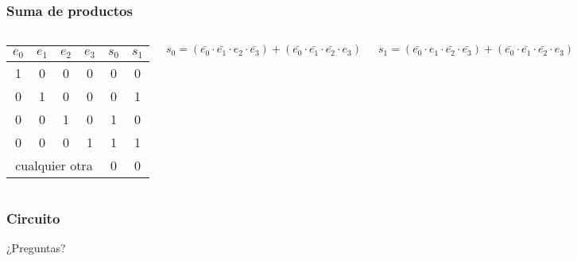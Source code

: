\documentclass[spanish]{beamer}
\begin{document}
\begin{frame}
  \frametitle{Suma de productos}

  \begin{columns}

    \begin{center}
      \begin{tabular}{c|c|c|c||c|c}
        $e_0$ & $e_1$ & $e_2$ & $e_3$ & $s_0$ & $s_1$ \\
        \hline
        1 & 0 & 0 & 0 & 0 & 0 \\
        0 & 1 & 0 & 0 & 0 & 1 \\
        0 & 0 & 1 & 0 & 1 & 0 \\
        0 & 0 & 0 & 1 & 1 & 1 \\
        \hline
        \multicolumn{4}{c||}{cualquier otra} & 0 & 0 \\
      \end{tabular}
    \end{center}

    \pause


    $s_0 = (\bar{e_0} \cdot \bar{e_1} \cdot e_2 \cdot \bar{e_3}) +
           (\bar{e_0} \cdot \bar{e_1} \cdot \bar{e_2} \cdot e_3)$

    \pause

    $s_1 = (\bar{e_0} \cdot e_1 \cdot \bar{e_2} \cdot \bar{e_3}) +
           (\bar{e_0} \cdot \bar{e_1} \cdot \bar{e_2} \cdot e_3)$


  \end{columns}

\end{frame}


\begin{frame}
  \frametitle{Circuito}

\end{frame}

\begin{frame}
  \begin{center}
    \Huge{¿Preguntas?}
  \end{center}
\end{frame}
\end{document}
